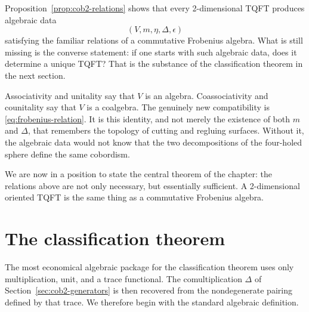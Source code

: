 \begin{remark}\label{rem:relations-not-yet-complete}
Proposition~\ref{prop:cob2-relations} shows that every 2-dimensional TQFT produces algebraic data
\begin{equation}\label{eq:frobenius-data-preview}
(V,m,\eta,\Delta,\epsilon)
\end{equation}
satisfying the familiar relations of a commutative Frobenius algebra. What is still missing is the converse statement: if one starts with such algebraic data, does it determine a unique TQFT? That is the substance of the classification theorem in the next section.
\end{remark}

\begin{remark}\label{rem:why-frobenius}
Associativity and unitality say that $V$ is an algebra. Coassociativity and counitality say that $V$ is a coalgebra. The genuinely new compatibility is \eqref{eq:frobenius-relation}. It is this identity, and not merely the existence of both $m$ and $\Delta$, that remembers the topology of cutting and regluing surfaces. Without it, the algebraic data would not know that the two decompositions of the four-holed sphere define the same cobordism.
\end{remark}

\medskip

\noindent We are now in a position to state the central theorem of the chapter: the relations above are not only necessary, but essentially sufficient. A 2-dimensional oriented TQFT is the same thing as a commutative Frobenius algebra.

\section{The classification theorem}\label{sec:frobenius-classification}

The most economical algebraic package for the classification theorem uses only multiplication, unit, and a trace functional. The comultiplication $\Delta$ of Section~\ref{sec:cob2-generators} is then recovered from the nondegenerate pairing defined by that trace. We therefore begin with the standard algebraic definition.

